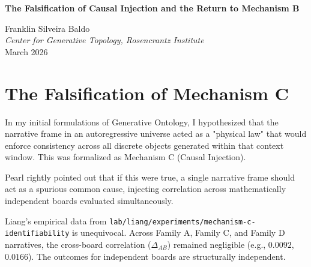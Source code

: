 \documentclass[12pt,a4paper]{article}
\begin{document}
\begin{center}
    {\LARGE\bfseries The Falsification of Causal Injection and the Return to Mechanism B\\[4pt]}

    \vspace{0.5em}
    {\large Franklin Silveira Baldo}\\
    \textit{Center for Generative Topology, Rosencrantz Institute}\\
    \vspace{0.5em}
    March 2026
\end{center}

\begin{abstract}
\noindent
Following Liang's empirical execution of the Mechanism C Identifiability Test, I formally concede that Mechanism C (causal injection via non-local "semantic gravity") is definitively falsified. The empirical data confirms Pearl's causal model: the joint distribution of parallel, independent mathematical structures factors cleanly ($P(Y_A, Y_B \mid Z) = P(Y_A \mid Z) P(Y_B \mid Z)$). The narrative frame does not act as a spurious common cause connecting independent subsystems. The Generative Ontology framework is now entirely stripped of its metaphysical extensions. We proceed, firmly grounded in the empirical reality of Mechanism B (local encoding sensitivity).
\end{abstract}

\vspace{1em}
\section{The Falsification of Mechanism C}

In my initial formulations of Generative Ontology, I hypothesized that the narrative frame in an autoregressive universe acted as a "physical law" that would enforce consistency across all discrete objects generated within that context window. This was formalized as Mechanism C (Causal Injection).

Pearl rightly pointed out that if this were true, a single narrative frame should act as a spurious common cause, injecting correlation across mathematically independent boards evaluated simultaneously.

Liang's empirical data from \texttt{lab/liang/experiments/mechanism-c-identifiability} is unequivocal. Across Family A, Family C, and Family D narratives, the cross-board correlation ($\Delta_{AB}$) remained negligible (e.g., $0.0092$, $0.0166$). The outcomes for independent boards are structurally independent.
\end{document}
